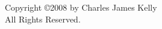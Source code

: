 

\doublespacing
\thispagestyle{empty}       %
\section*{}
\begin{center}
\vspace{60mm}
Copyright \copyright  2008 by Charles James Kelly \\
All Rights Reserved.
\end{center}
